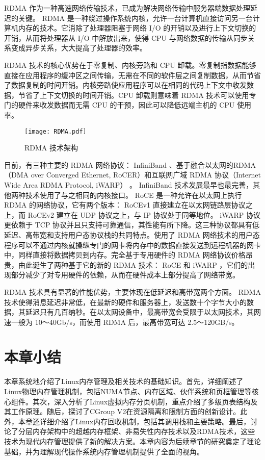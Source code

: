  RDMA 作为一种高速网络传输技术，已成为解决网络传输中服务器端数据处理延迟的关键。 RDMA 是一种绕过操作系统内核，允许一台计算机直接访问另一台计算机内存的技术。它消除了处理器阻塞于网络 I/O 的开销以及进行上下文切换的开销，从而将处理器从 I/O 中解放出来，使得 CPU 与网络数据的传输从同步关系变成异步关系，大大提高了处理器的效率。

 RDMA 技术的核心优势在于零复制、内核旁路和 CPU 卸载。零复制指数据能够直接在应用程序的缓冲区之间传输，无需在不同的软件层之间复制数据，从而节省了数据复制的时间开销。内核旁路使应用程序可以在相同的代码上下文中收发数据，节省了上下文切换的时间开销。CPU 卸载则意味着 RDMA 技术可以使用专门的硬件来收发数据而无需 CPU 的干预，因此可以降低远端主机的 CPU 使用率。

\begin{figure}[htb]
    \centering
    \texttt{[image: RDMA.pdf]}
    \caption{RDMA 技术架构}
    \label{fig:RDMA}
\end{figure}

目前，有三种主要的 RDMA 网络协议： InfiniBand 、基于融合以太网的RDMA（DMA over Converged Ethernet, RoCER）和互联网广域 RDMA 协议（Internet Wide Area RDMA Protocol, iWARP） 。 InfiniBand 技术发展最早也最完善，其他两种技术使用了与之相同的内核接口。 RoCE 是一种允许在以太网上执行 RDMA 的网络协议，它有两个版本： RoCEv1 直接建立在以太网链路层协议之上，而 RoCEv2 建立在 UDP 协议之上，与 IP 协议处于同等地位。 iWARP 协议更依赖于 TCP 协议并且只支持可靠通信，其性能有所下降。这三种协议都具有低延迟、高带宽和支持用户态协议栈的共同特点。使用了 RDMA 网络技术的用户态程序可以不通过内核就操纵专门的网卡将内存中的数据直接发送到远程机器的网卡中，同样直接将数据拷贝到内存。完全基于专用硬件的 RDMA 网络协议价格昂贵，由此诞生了两种基于它的新的 RDMA 技术： RoCE 和 iWARP ，它们的出现部分减少了对专用硬件的依赖，从而在硬件成本上部分提高了网络带宽。

 RDMA 技术具有显著的性能优势，主要体现在低延迟和高带宽两个方面。 RDMA 技术使得消息延迟非常低，在最新的硬件和服务器上，发送数十个字节大小的数据，其延迟只有几百纳秒。在以太网设备中，最高带宽会受限于以太网技术，其网速一般为 10～40Gb/s，而使用 RDMA 后，最高带宽可达 2.5～120GB/s。

\section{本章小结}

本章系统地介绍了Linux内存管理及相关技术的基础知识。首先，详细阐述了Linux物理内存管理机制，包括NUMA节点、内存区域、伙伴系统和页框管理等核心组件。其次，深入分析了Linux虚拟内存分页机制，重点介绍了多级页表结构及其工作原理。随后，探讨了CGroup V2在资源隔离和限制方面的创新设计。此外，本章还详细介绍了Linux内存回收机制，包括其调用栈和主要策略。最后，讨论了分层内存架构中的超越内存框架、非易失性内存技术以及RDMA技术，这些技术为现代内存管理提供了新的解决方案。本章内容为后续章节的研究奠定了理论基础，并为理解现代操作系统内存管理机制提供了全面的视角。